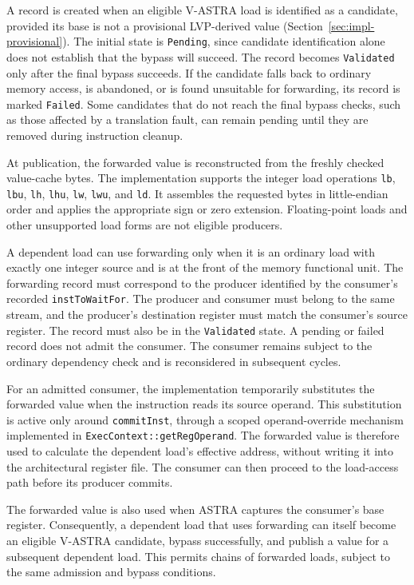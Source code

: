 A record is created when an eligible V-ASTRA load is identified
as a candidate, provided its base is not a provisional LVP-derived
value (Section~\ref{sec:impl-provisional}). The initial state is \texttt{Pending}, since
candidate identification alone does not establish that the
bypass will succeed. The record becomes \texttt{Validated} only
after the final bypass succeeds. If the candidate falls back to
ordinary memory access, is abandoned, or is found unsuitable for
forwarding, its record is marked \texttt{Failed}. Some candidates
that do not reach the final bypass checks, such as those affected
by a translation fault, can remain pending until they are
removed during instruction cleanup.

At publication, the forwarded value is reconstructed from the
freshly checked value-cache bytes. The implementation supports
the integer load operations \texttt{lb}, \texttt{lbu},
\texttt{lh}, \texttt{lhu}, \texttt{lw}, \texttt{lwu}, and
\texttt{ld}. It assembles the requested bytes in little-endian
order and applies the appropriate sign or zero extension.
Floating-point loads and other unsupported load forms are not
eligible producers.

A dependent load can use forwarding only when it is an ordinary
load with exactly one integer source and is at the front of the
memory functional unit. The forwarding record must correspond to the producer
identified by the consumer's recorded
\texttt{instToWaitFor}. The producer and consumer must belong
to the same stream, and the producer's destination register must
match the consumer's source register. The record must also be in
the \texttt{Validated} state. A pending or failed record does not
admit the consumer. The consumer remains subject to the ordinary
dependency check and is reconsidered in subsequent cycles.

For an admitted consumer, the implementation temporarily
substitutes the forwarded value when the instruction reads its
source operand. This substitution is active only around
\texttt{commitInst}, through a scoped operand-override mechanism
implemented in \texttt{ExecContext::\allowbreak getRegOperand}. The
forwarded value is therefore used to calculate the dependent
load's effective address, without writing it into the
architectural register file. The consumer can then proceed to
the load-access path before its producer commits.

The forwarded value is also used when ASTRA captures the
consumer's base register. Consequently, a dependent load that
uses forwarding can itself become an eligible V-ASTRA candidate,
bypass successfully, and publish a value for a subsequent
dependent load. This permits chains of forwarded loads, subject
to the same admission and bypass conditions.

